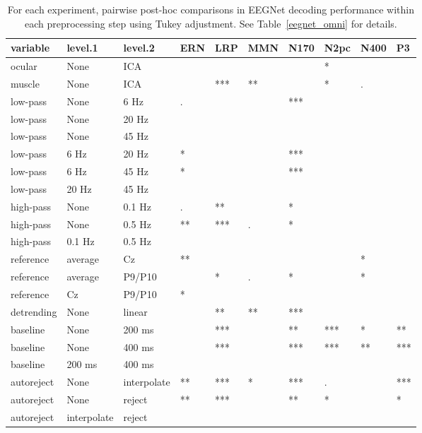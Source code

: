 \begin{table}[!htp]
\begin{widestuff}
\caption{For each experiment, pairwise post-hoc comparisons in EEGNet decoding performance within each preprocessing step using Tukey adjustment. See Table~\ref{eegnet_omni} for details.} 
\label{eegnet_contrasts}
\begin{tabular}{llllllllll}
  \hline
variable & level.1 & level.2 & ERN & LRP & MMN & N170 & N2pc & N400 & P3 \\ 
  \hline
ocular & None & ICA &   &   &   &   & * &   &   \\ 
  muscle & None & ICA &   & *** & ** &   & * & . &   \\ 
  low-pass & None & 6 Hz & . &   &   & *** &   &   &   \\ 
  low-pass & None & 20 Hz &   &   &   &   &   &   &   \\ 
  low-pass & None & 45 Hz &   &   &   &   &   &   &   \\ 
  low-pass & 6 Hz & 20 Hz & * &   &   & *** &   &   &   \\ 
  low-pass & 6 Hz & 45 Hz & * &   &   & *** &   &   &   \\ 
  low-pass & 20 Hz & 45 Hz &   &   &   &   &   &   &   \\ 
  high-pass & None & 0.1 Hz & . & ** &   & * &   &   &   \\ 
  high-pass & None & 0.5 Hz & ** & *** & . & * &   &   &   \\ 
  high-pass & 0.1 Hz & 0.5 Hz &   &   &   &   &   &   &   \\ 
  reference & average & Cz & ** &   &   &   &   & * &   \\ 
  reference & average & P9/P10 &   & * & . & * &   & * &   \\ 
  reference & Cz & P9/P10 & * &   &   &   &   &   &   \\ 
  detrending & None & linear &   & ** & ** & *** &   &   &   \\ 
  baseline & None & 200 ms &   & *** &   & ** & *** & * & ** \\ 
  baseline & None & 400 ms &   & *** &   & *** & *** & ** & *** \\ 
  baseline & 200 ms & 400 ms &   &   &   &   &   &   &   \\ 
  autoreject & None & interpolate & ** & *** & * & *** & . &   & *** \\ 
  autoreject & None & reject & ** & *** &   & ** & * &   & * \\ 
  autoreject & interpolate & reject &   &   &   &   &   &   &   \\ 
   \hline
\end{tabular}
\end{widestuff}
\end{table}
